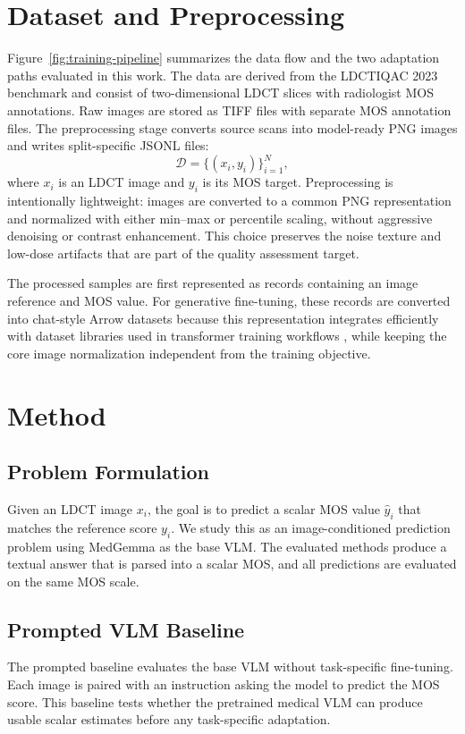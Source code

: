 \documentclass[10pt,twocolumn,letterpaper]{article}
\begin{document}
\section{Dataset and Preprocessing}
Figure~\ref{fig:training-pipeline} summarizes the data flow and the two adaptation paths evaluated in this work. The data are derived from the LDCTIQAC 2023 benchmark \cite{lee2025low} and consist of two-dimensional LDCT slices with radiologist MOS annotations. Raw images are stored as TIFF files with separate MOS annotation files. The preprocessing stage converts source scans into model-ready PNG images and writes split-specific JSONL files:
\begin{equation}
  \mathcal{D}=\{(x_i, y_i)\}_{i=1}^{N},
\end{equation}
where $x_i$ is an LDCT image and $y_i$ is its MOS target. Preprocessing is intentionally lightweight: images are converted to a common PNG representation and normalized with either min--max or percentile scaling, without aggressive denoising or contrast enhancement. This choice preserves the noise texture and low-dose artifacts that are part of the quality assessment target.

The processed samples are first represented as records containing an image reference and MOS value. For generative fine-tuning, these records are converted into chat-style Arrow datasets because this representation integrates efficiently with dataset libraries used in transformer training workflows \cite{lhoest2021datasets}, while keeping the core image normalization independent from the training objective.

\section{Method}
\subsection{Problem Formulation}
Given an LDCT image $x_i$, the goal is to predict a scalar MOS value $\hat{y}_i$ that matches the reference score $y_i$. We study this as an image-conditioned prediction problem using MedGemma as the base VLM. The evaluated methods produce a textual answer that is parsed into a scalar MOS, and all predictions are evaluated on the same MOS scale.

\subsection{Prompted VLM Baseline}
The prompted baseline evaluates the base VLM without task-specific fine-tuning. Each image is paired with an instruction asking the model to predict the MOS score. This baseline tests whether the pretrained medical VLM can produce usable scalar estimates before any task-specific adaptation.
\end{document}
